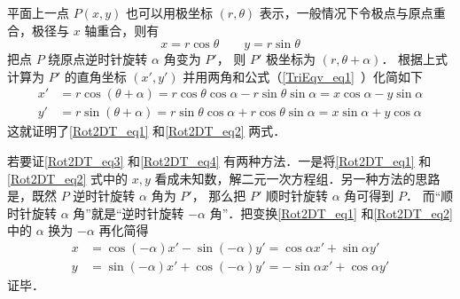 平面上一点 $P(x,y)$ 也可以用极坐标 $(r, \theta)$ 表示，一般情况下令极点与原点重合，极径与 $x$ 轴重合，则有
\begin{equation}
x = r\cos \theta \qquad y = r\sin \theta 
\end{equation}     
把点 $P$ 绕原点逆时针旋转 $\alpha $ 角变为 $P'$， 则 $P'$ 极坐标为 $(r, \theta  + \alpha)$． 根据上式计算为 $P'$ 的直角坐标 $(x', y')$ 并用两角和公式（\autoref{TriEqv_eq1}~）化简如下
\begin{align}
x' &= r\cos(\theta  + \alpha) = r\cos\theta \cos\alpha  - r\sin\theta \sin\alpha  = x\cos\alpha  - y\sin\alpha \\
y' &= r\sin(\theta  + \alpha) = r\sin\theta \cos\alpha  + r\cos\theta \sin\alpha  = x\sin\alpha  + y\cos\alpha 
\end{align} 
这就证明了\autoref{Rot2DT_eq1} 和\autoref{Rot2DT_eq2} 两式．

若要证\autoref{Rot2DT_eq3} 和\autoref{Rot2DT_eq4} 有两种方法．一是将\autoref{Rot2DT_eq1} 和\autoref{Rot2DT_eq2} 式中的 $x, y$ 看成未知数，解二元一次方程组．另一种方法的思路是，既然 $P$ 逆时针旋转 $\alpha $ 角为 $P'$， 那么把 $P'$ 顺时针旋转 $\alpha$ 角可得到 $P$． 而“顺时针旋转 $\alpha$ 角”就是“逆时针旋转 $-\alpha $ 角”．把变换\autoref{Rot2DT_eq1} 和\autoref{Rot2DT_eq2} 中的 $\alpha$ 换为 $-\alpha$ 再化简得
 \begin{align}
x &= \cos(-\alpha) x' - \sin(-\alpha) y' = \cos\alpha x' + \sin\alpha y'\\
y &= \sin(-\alpha) x' + \cos(-\alpha) y' =  -\sin\alpha x' + \cos\alpha y'
\end{align}
证毕．
